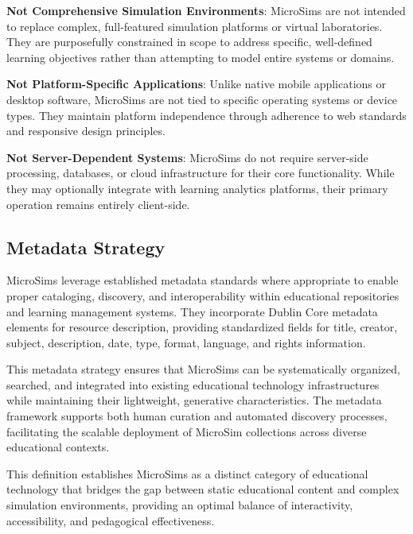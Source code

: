 \textbf{Not Comprehensive Simulation Environments}: MicroSims are not intended to replace complex, full-featured simulation platforms or virtual laboratories. They are purposefully constrained in scope to address specific, well-defined learning objectives rather than attempting to model entire systems or domains.

\textbf{Not Platform-Specific Applications}: Unlike native mobile applications or desktop software, MicroSims are not tied to specific operating systems or device types. They maintain platform independence through adherence to web standards and responsive design principles.

\textbf{Not Server-Dependent Systems}: MicroSims do not require server-side processing, databases, or cloud infrastructure for their core functionality. While they may optionally integrate with learning analytics platforms, their primary operation remains entirely client-side.

\subsection{Metadata Strategy}

MicroSims leverage established metadata standards where appropriate to enable proper cataloging, discovery, and interoperability within educational repositories and learning management systems. They incorporate Dublin Core metadata elements for resource description, providing standardized fields for title, creator, subject, description, date, type, format, language, and rights information.

This metadata strategy ensures that MicroSims can be systematically organized, searched, and integrated into existing educational technology infrastructures while maintaining their lightweight, generative characteristics. The metadata framework supports both human curation and automated discovery processes, facilitating the scalable deployment of MicroSim collections across diverse educational contexts.

This definition establishes MicroSims as a distinct category of educational technology that bridges the gap between static educational content and complex simulation environments, providing an optimal balance of interactivity, accessibility, and pedagogical effectiveness.
